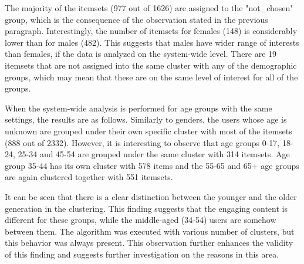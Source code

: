 The majority of the itemsets (977 out of 1626) are assigned to the "not\_chosen" group, which is the consequence of the observation stated in the previous paragraph. Interestingly, the number of itemsets for females (148) is considerably lower than for males (482). This suggests that males have wider range of interests than females, if the data is analyzed on the system-wide level. There are 19 itemsets that are not assigned into the same cluster with any of the demographic groups, which may mean that these are on the same level of interest for all of the groups. 

When the system-wide analysis is performed for age groups with the same settings, the results are as follows. Similarly to genders, the users whose age is unknown are grouped under their own specific cluster with most of the itemsets (888 out of 2332). However, it is interesting to observe that age groups 0-17, 18-24, 25-34 and 45-54 are grouped under the same cluster with 314 itemsets. Age group 35-44 has its own cluster with 578 items and the 55-65 and 65+ age groups are again clustered together with 551 itemsets. 

It can be seen that there is a clear distinction between the younger and the older generation in the clustering. This finding suggests that the engaging content is different for these groups, while the middle-aged (34-54) users are somehow between them. The algorithm was executed with various number of clusters, but this behavior was always present. This observation further enhances the validity of this finding and suggests further investigation on the reasons in this area.